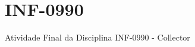 \chapter{INF-\/0990}
\hypertarget{md__r_e_a_d_m_e}{}\label{md__r_e_a_d_m_e}
\label{md__r_e_a_d_m_e_autotoc_md0}%
%
Atividade Final da Disciplina INF-\/0990 -\/  Collector 